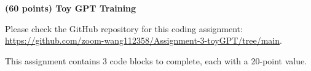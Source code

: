 \item \textbf{(60 points) Toy GPT Training}

Please check the GitHub repository for this coding assignment: \href{https://github.com/zoom-wang112358/Assignment-3-toyGPT/tree/main}{https://github.com/zoom-wang112358/Assignment-3-toyGPT/tree/main}.

This assignment contains 3 code blocks to complete, each with a 20-point value. 

